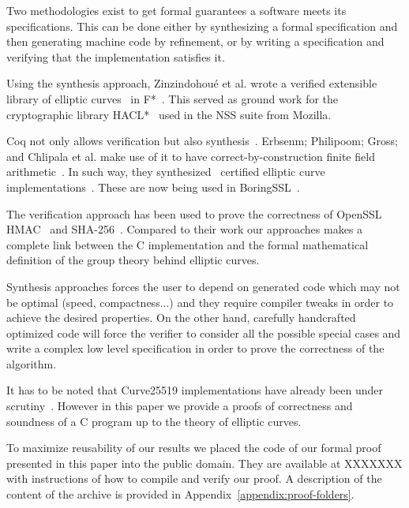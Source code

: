 Two methodologies exist to get formal guarantees a software meets its specifications.
This can be done either by synthesizing a formal specification and then generating
machine code by refinement, or by writing a specification and verifying that the
implementation satisfies it.

Using the synthesis approach, Zinzindohou{\'{e}} et al. wrote a verified extensible
library of elliptic curves~\cite{Zinzindohoue2016AVE} in F*~\cite{DBLP:journals/corr/BhargavanDFHPRR17}.
This served as ground work for the cryptographic library HACL*~\cite{zinzindohoue2017hacl}
used in the NSS suite from Mozilla.

Coq not only allows verification but also synthesis~\cite{CpdtJFR}.
Erbsenm; Philipoom; Gross; and Chlipala et al. make use of it to have
correct-by-construction finite field arithmetic~\cite{Philipoom2018CorrectbyconstructionFF}.
In such way, they synthesized~\cite{Erbsen2016SystematicSO} certified elliptic curve
implementations~\cite{Erbsen2017CraftingCE}. These are now being used in
BoringSSL~\cite{fiat-crypto}.

The verification approach has been used to prove the correctness of OpenSSL
HMAC~\cite{Beringer2015VerifiedCA} and SHA-256~\cite{2015-Appel}. Compared to
their work our approaches makes a complete link between the C implementation and
the formal mathematical definition of the group theory behind elliptic curves.

Synthesis approaches forces the user to depend on generated code which may not
be optimal (speed, compactness...) and they require compiler tweaks in order
to achieve the desired properties. On the other hand, carefully handcrafted
optimized code will force the verifier to consider all the possible special cases
and write a complex low level specification in order to prove the correctness of
the algorithm.

It has to be noted that Curve25519 implementations have already been under scrutiny~\cite{Chen2014VerifyingCS}.
However in this paper we provide a proofs of correctness and soundness of a C program up to
the theory of elliptic curves.

To maximize reusability of our results we placed the code of our formal proof
presented in this paper into the public domain. They are available at XXXXXXX
with instructions of how to compile and verify our proof.
A description of the content of the archive is provided in
Appendix~\ref{appendix:proof-folders}.

